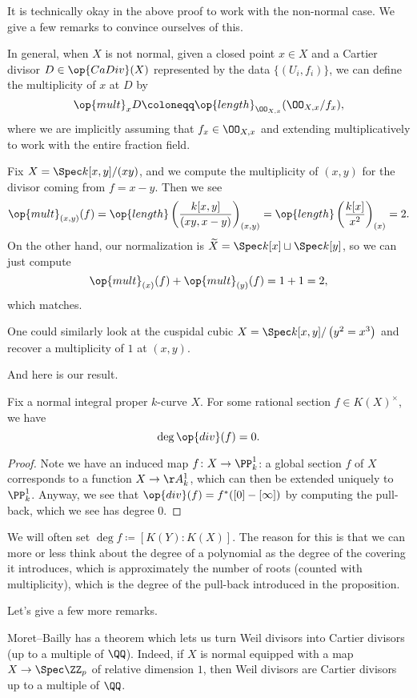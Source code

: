 \documentclass[../notes.tex]{subfiles}
\begin{document}
It is technically okay in the above proof to work with the non-normal case. We give a few remarks to convince ourselves of this.
\begin{remark}
	In general, when $X$ is not normal, given a closed point $x\in X$ and a Cartier divisor $D\in\op{CaDiv}(X)$ represented by the data $\{(U_i,f_i)\}$, we can define the multiplicity of $x$ at $D$ by
	\[\op{mult}_xD\coloneqq\op{length}_{\OO_{X,x}}(\OO_{X,x}/f_x),\]
	where we are implicitly assuming that $f_x\in\OO_{X,x}$ and extending multiplicatively to work with the entire fraction field.
\end{remark}
\begin{example}
	Fix $X=\Spec k[x,y]/(xy)$, and we compute the multiplicity of $(x,y)$ for the divisor coming from $f=x-y$. Then we see
	\[\op{mult}_{(x,y)}(f)=\op{length}\left(\frac{k[x,y]}{(xy,x-y)}\right)_{(x,y)}=\op{length}\left(\frac{k[x]}{x^2}\right)_{(x)}=2.\]
	On the other hand, our normalization is $\widetilde X=\Spec k[x]\sqcup\Spec k[y]$, so we can just compute
	\[\op{mult}_{(x)}(f)+\op{mult}_{(y)}(f)=1+1=2,\]
	which matches.
\end{example}
\begin{example}
	One could similarly look at the cuspidal cubic $X=\Spec k[x,y]/\left(y^2=x^3\right)$ and recover a multiplicity of $1$ at $(x,y)$.
\end{example}
And here is our result.
\begin{corollary}
	Fix a normal integral proper $k$-curve $X$. For some rational section $f\in K(X)^\times$, we have
	\[\deg\op{div}(f)=0.\]
\end{corollary}
\begin{proof}
	Note we have an induced map $f\colon X\to\PP^1_k$: a global section $f$ of $X$ corresponds to a function $X\to\AA^1_k$, which can then be extended uniquely to $\PP^1_k$. Anyway, we see that $\op{div}(f)=f^*([0]-[\infty])$ by computing the pull-back, which we see has degree $0$.
\end{proof}
\begin{remark}
	We will often set $\deg f\coloneqq[K(Y):K(X)]$. The reason for this is that we can more or less think about the degree of a polynomial as the degree of the covering it introduces, which is approximately the number of roots (counted with multiplicity), which is the degree of the pull-back introduced in the proposition.
\end{remark}
Let's give a few more remarks.
\begin{remark}
	Moret--Bailly has a theorem which lets us turn Weil divisors into Cartier divisors (up to a multiple of $\QQ$). Indeed, if $X$ is normal equipped with a map $X\to\Spec\ZZ_p$ of relative dimension $1$, then Weil divisors are Cartier divisors up to a multiple of $\QQ$.
\end{remark}
\end{document}
